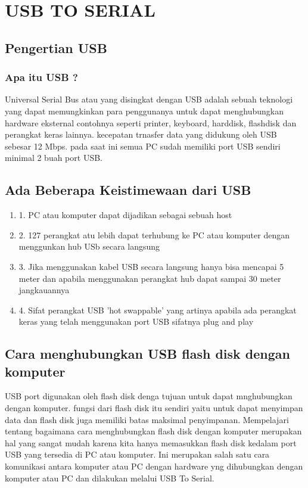 
\section {USB TO SERIAL}

\subsection {Pengertian USB}
\subsubsection {Apa itu USB ?}
	Universal Serial Bus atau yang disingkat dengan USB adalah sebuah teknologi yang dapat memungkinkan para penggunanya untuk dapat menghubungkan hardware eksternal contohnya seperti printer, keyboard, harddisk, flashdisk dan perangkat keras lainnya. kecepatan trnasfer data yang didukung oleh USB sebesar 12 Mbps. pada saat ini semua PC sudah memiliki port USB sendiri minimal 2 buah port USB.

\subsection {Ada Beberapa Keistimewaan dari USB}
\begin {enumerate}
\item
1. PC atau komputer dapat dijadikan sebagai sebuah host
\item
2. 127 perangkat atu lebih dapat terhubung ke PC atau komputer dengan menggunkan hub USb secara langsung
\item
3. Jika menggunakan kabel USB secara langsung hanya bisa mencapai 5 meter dan apabila menggunakan perangkat hub dapat sampai 30 meter jangkauannya
\item
4. Sifat perangkat USB 'hot swappable' yang artinya apabila ada perangkat keras yang telah menggunakan port USB sifatnya plug and play
\end {enumerate}

\subsection {Cara menghubungkan USB flash disk dengan komputer}
	USB port digunakan oleh flash disk denga tujuan untuk dapat mnghubungkan dengan komputer. fungsi dari flash disk itu sendiri yaitu untuk dapat menyimpan data dan flash disk juga memiliki batas maksimal penyimpanan. Mempelajari tentang bagaimana cara menghubungkan flash disk dengan komputer merupakan hal yang sangat mudah karena kita hanya memasukkan flash disk kedalam port USB yang tersedia di PC atau komputer. Ini merupakan salah satu cara komunikasi antara komputer atau PC dengan hardware yng dihubungkan dengan komputer atau PC dan dilakukan melalui USB To Serial.
	
